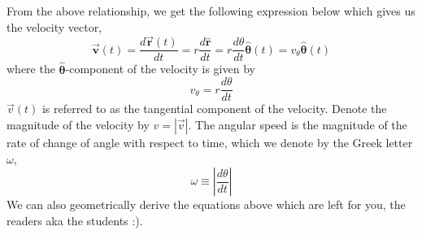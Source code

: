 \documentclass[12pt,addpoints]{exam}
\begin{document}
	From the above relationship, we get the following expression below which gives us the velocity vector,
	$$\overrightarrow{\mathbf{v}}(t)=\frac{d \overrightarrow{\mathbf{r}}(t)}{d t}=r \frac{d \hat{\mathbf{r}}}{d t}=r \frac{d \theta}{d t} \hat{\boldsymbol{\theta}}(t)=v_{\theta} \hat{\boldsymbol{\theta}}(t) \nonumber$$
	where the  $\hat{\boldsymbol{\theta}}$-component of the velocity is given by
	$$v_{\theta}=r \frac{d \theta}{d t} \nonumber$$
	$\vec{v}(t)$ is referred to as the tangential component of the velocity. Denote the magnitude of the velocity by  $v=|\vec{v}|$. The angular speed is the magnitude of the rate of change of angle with respect to time, which we denote by the Greek letter $\omega$,
	$$\omega \equiv\left|\frac{d \theta}{d t}\right| \nonumber$$
	We can also geometrically derive the equations above which are left for you, the readers aka the students :).
\end{document}
